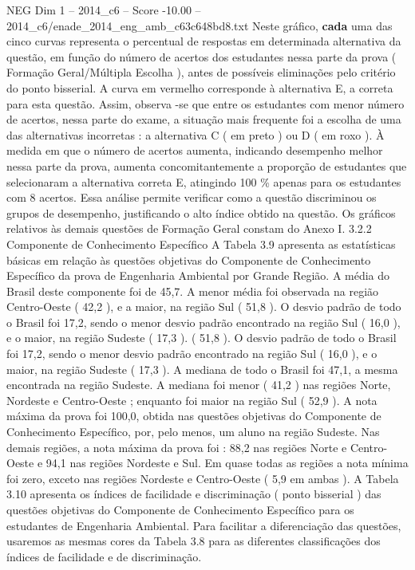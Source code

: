 \begin{textsample}{NEG Dim 1 – 2014\_c6 – Score -10.00 – 2014\_c6/enade\_2014\_eng\_amb\_c63c648bd8.txt}
Neste gráfico, \textbf{cada} uma das cinco curvas representa o percentual de respostas em determinada alternativa da questão, em função do número de acertos dos estudantes nessa parte da prova ( Formação Geral/Múltipla Escolha ), antes de possíveis eliminações pelo critério do ponto bisserial.
A curva em vermelho corresponde à alternativa E, a correta para esta questão.
Assim, observa -se que entre os estudantes com menor número de acertos, nessa parte do exame, a situação mais frequente foi a escolha de uma das alternativas incorretas : a alternativa C ( em preto ) ou D ( em roxo ).
À medida em que o número de acertos aumenta, indicando desempenho melhor nessa parte da prova, aumenta concomitantemente a proporção de estudantes que selecionaram a alternativa correta E, atingindo 100 \% apenas para os estudantes com 8 acertos.
Essa análise permite verificar como a questão discriminou os grupos de desempenho, justificando o alto índice obtido na questão.
Os gráficos relativos às demais questões de Formação Geral constam do Anexo I. 3.2.2 Componente de Conhecimento Específico A Tabela 3.9 apresenta as estatísticas básicas em relação às questões objetivas do Componente de Conhecimento Específico da prova de Engenharia Ambiental por Grande Região.
A média do Brasil deste componente foi de 45,7.
A menor média foi observada na região Centro-Oeste ( 42,2 ), e a maior, na região Sul ( 51,8 ).
O desvio padrão de todo o Brasil foi 17,2, sendo o menor desvio padrão encontrado na região Sul ( 16,0 ), e o maior, na região Sudeste ( 17,3 ). ( 51,8 ).
O desvio padrão de todo o Brasil foi 17,2, sendo o menor desvio padrão encontrado na região Sul ( 16,0 ), e o maior, na região Sudeste ( 17,3 ).
A mediana de todo o Brasil foi 47,1, a mesma encontrada na região Sudeste.
A mediana foi menor ( 41,2 ) nas regiões Norte, Nordeste e Centro-Oeste ; enquanto foi maior na região Sul ( 52,9 ).
A nota máxima da prova foi 100,0, obtida nas questões objetivas do Componente de Conhecimento Específico, por, pelo menos, um aluno na região Sudeste.
Nas demais regiões, a nota máxima da prova foi : 88,2 nas regiões Norte e Centro-Oeste e 94,1 nas regiões Nordeste e Sul.
Em quase todas as regiões a nota mínima foi zero, exceto nas regiões Nordeste e Centro-Oeste ( 5,9 em ambas ).
A Tabela 3.10 apresenta os índices de facilidade e discriminação ( ponto bisserial ) das questões objetivas do Componente de Conhecimento Específico para os estudantes de Engenharia Ambiental.
Para facilitar a diferenciação das questões, usaremos as mesmas cores da Tabela 3.8 para as diferentes classificações dos índices de facilidade e de discriminação.

\end{textsample}
